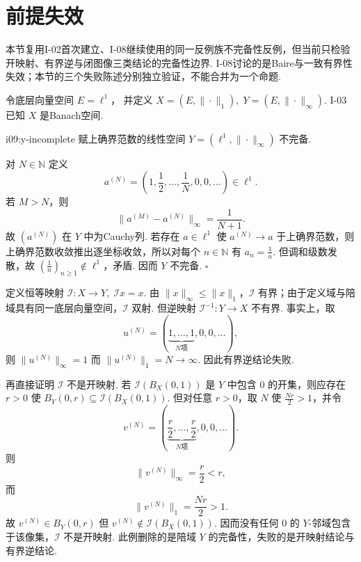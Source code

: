 \section{前提失效}\label{sec:i09-assumption-failure}

本节复用I-02首次建立、I-08继续使用的同一反例族不完备性反例，但当前只检验开映射、有界逆与闭图像三类结论的完备性边界. I-08讨论的是Baire与一致有界性失效；本节的三个失败陈述分别独立验证，不能合并为一个命题.

令底层向量空间
\(\displaystyle E=\ell^1\)，
并定义
\(\displaystyle X=(E,\|\cdot\|_1), \; Y=(E,\|\cdot\|_\infty)\).
I-03已知 \(\displaystyle X\) 是Banach空间.

\begin{FAProposition}{i09:y-incomplete}
赋上确界范数的线性空间 \(\displaystyle Y=(\ell^1,\|\cdot\|_\infty)\) 不完备.
\end{FAProposition}

\begin{FAProof}
对 \(\displaystyle N\in\mathbb N\) 定义
\[
a^{(N)}
=\left(1,\frac{1}{2},\dots,\frac{1}{N},0,0,\dots\right)\in\ell^1.
\]
若 \(\displaystyle M>N\)，则
\[
\|a^{(M)}-a^{(N)}\|_\infty
=\frac{1}{N+1}.
\]
故 \(\displaystyle (a^{(N)})\) 在 \(\displaystyle Y\) 中为Cauchy列. 若存在 \(\displaystyle a\in\ell^1\) 使 \(\displaystyle a^{(N)}\to a\) 于上确界范数，则上确界范数收敛推出逐坐标收敛，所以对每个 \(\displaystyle n\in\mathbb N\) 有 \(\displaystyle a_n=\frac{1}{n}\). 但调和级数发散，故 \(\displaystyle (\frac{1}{n})_{n\geqslant1}\notin\ell^1\)，矛盾. 因而 \(\displaystyle Y\) 不完备.
\hfill\(\square\)
\end{FAProof}

\begin{FACounterexample}[删除陪域完备性后开映射与有界逆可失效]\label{i09:ce-incomplete-omt}
定义恒等映射
\(\displaystyle \mathcal I:X\to Y, \; \mathcal Ix=x\).
由 \(\displaystyle \|x\|_\infty\leqslant\|x\|_1\)，\(\displaystyle \mathcal I\) 有界；由于定义域与陪域具有同一底层向量空间，\(\displaystyle \mathcal I\) 双射. 但逆映射 \(\displaystyle \mathcal I^{-1}:Y\to X\) 不有界. 事实上，取
\[
u^{(N)}=(\underbrace{1,\dots,1}_{N\text{项}},0,0,\dots),
\]
则 \(\displaystyle \|u^{(N)}\|_\infty=1\) 而 \(\displaystyle \|u^{(N)}\|_1=N\to\infty\). 因此有界逆结论失败.

再直接证明 \(\displaystyle \mathcal I\) 不是开映射. 若 \(\displaystyle \mathcal I(B_X(0,1))\) 是 \(\displaystyle Y\) 中包含 \(\displaystyle0\) 的开集，则应存在 \(\displaystyle r>0\) 使 \(\displaystyle B_Y(0,r)\subseteq\mathcal I(B_X(0,1))\). 但对任意 \(\displaystyle r>0\)，取 \(\displaystyle N\) 使 \(\displaystyle \frac{Nr}{2}>1\)，并令
\[
v^{(N)}=(\underbrace{\frac{r}{2},\dots,\frac{r}{2}}_{N\text{项}},0,0,\dots).
\]
则
\[
\|v^{(N)}\|_\infty=\frac{r}{2}<r,
\]
而
\[
\|v^{(N)}\|_1=\frac{Nr}{2}>1.
\]
故 \(\displaystyle v^{(N)}\in B_Y(0,r)\) 但 \(\displaystyle v^{(N)}\notin\mathcal I(B_X(0,1))\). 因而没有任何 \(\displaystyle0\) 的 \(\displaystyle Y\)-邻域包含于该像集，\(\displaystyle \mathcal I\) 不是开映射. 此例删除的是陪域 \(\displaystyle Y\) 的完备性，失败的是开映射结论与有界逆结论.
\end{FACounterexample}

